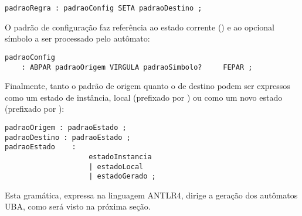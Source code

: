 \begin{lstlisting}[style=antlr]
padraoRegra : padraoConfig SETA padraoDestino ;
\end{lstlisting}

O padrão de configuração faz referência ao estado corrente () e ao opcional símbolo a ser processado pelo autômato:

\begin{lstlisting}[style=antlr]
padraoConfig
	: ABPAR padraoOrigem VIRGULA padraoSimbolo? 	FEPAR ;
\end{lstlisting}

Finalmente, tanto o padrão de origem quanto o de destino podem ser expressos como um estado de instância, local (prefixado por ) ou como um novo estado (prefixado por \terminal{^}):

\begin{lstlisting}[style=antlr]
padraoOrigem : padraoEstado ;
padraoDestino : padraoEstado ;
padraoEstado 	:
					estadoInstancia
					| estadoLocal
					| estadoGerado ;
\end{lstlisting}

Esta gramática, expressa na linguagem ANTLR4, dirige a geração dos autômatos UBA, como será visto na próxima seção.
